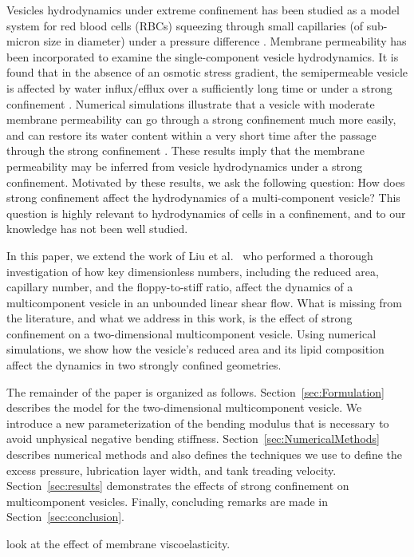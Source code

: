 \documentclass[twoside,twocolumn,9pt]{article}
\begin{document}
Vesicles hydrodynamics under extreme confinement has been studied as a model system for red blood cells (RBCs) squeezing through small
capillaries (of sub-micron size in diameter) under a pressure difference \cite{LuPeng2019_PoF}. Membrane permeability has been incorporated to examine the single-component vesicle hydrodynamics. It is found that  in the absence of an osmotic stress gradient, the semipermeable vesicle is affected by water influx/efflux over a sufficiently long time or under a strong confinement \cite{Quaife2021_PRF}. Numerical simulations illustrate that a vesicle with moderate membrane permeability can go through a strong confinement much more easily, and can restore its water content within a very short time after the passage through the strong confinement \cite{Quaife2021_PRF}.  These results imply that the membrane permeability may be inferred from vesicle hydrodynamics under a strong confinement.  Motivated by these results, we ask the following question: How does strong confinement affect the hydrodynamics of a multi-component vesicle? This question is highly relevant to hydrodynamics of cells in a confinement, and to our knowledge has not been well studied.


In this paper, we extend the work of Liu et
al.~\cite{liu-mar-li-vee-low2017} who performed a thorough investigation
of how key dimensionless numbers, including the reduced area, capillary
number, and the floppy-to-stiff ratio, affect the dynamics of a
multicomponent vesicle in an unbounded linear shear flow. What is
missing from the literature, and what we address in this work, is the
effect of strong confinement on a two-dimensional multicomponent
vesicle. Using numerical simulations, we show how the vesicle's reduced
area and its lipid composition affect the dynamics in two strongly
confined geometries.

The remainder of the paper is organized as follows.
Section~\ref{sec:Formulation} describes the model for the
two-dimensional multicomponent vesicle. We introduce a new
parameterization of the bending modulus that is necessary to avoid
unphysical negative bending stiffness.
Section~\ref{sec:NumericalMethods} describes numerical methods and also
defines the techniques we use to define the excess pressure, lubrication
layer width, and tank treading velocity. Section~\ref{sec:results}
demonstrates the effects of strong confinement on multicomponent
vesicles. Finally, concluding remarks are made in
Section~\ref{sec:conclusion}.

\citet{gur-pak-tay-siv-sac2023} look at the effect of membrane
viscoelasticity.
\end{document}
